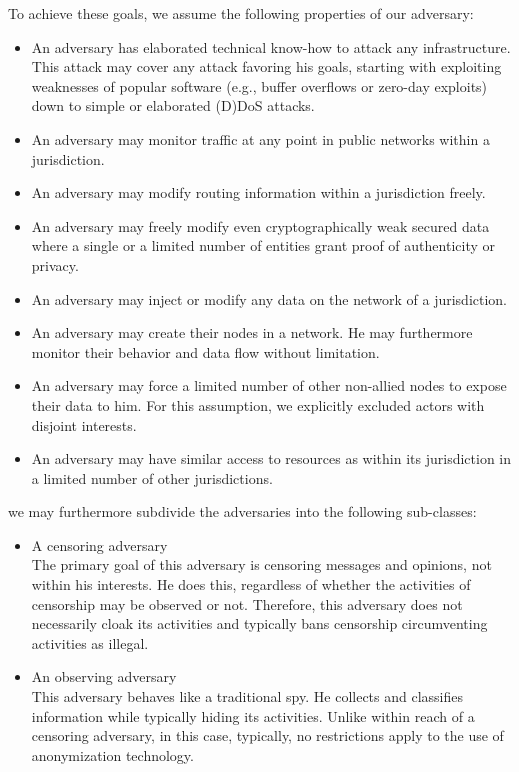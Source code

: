 To achieve these goals, we assume the following properties of our adversary:
\begin{itemize}
	\item An adversary has elaborated technical know-how to attack any infrastructure. This attack may cover any attack favoring his goals, starting with exploiting weaknesses of popular software (e.g., buffer overflows or zero-day exploits) down to simple or elaborated (D)DoS attacks.
	\item An adversary may monitor traffic at any point in public networks within a jurisdiction.
	\item An adversary may modify routing information within a jurisdiction freely.
	\item An adversary may freely modify even cryptographically weak secured data where a single or a limited number of entities grant proof of authenticity or privacy.
	\item An adversary may inject or modify any data on the network of a jurisdiction.
	\item An adversary may create their nodes in a network. He may furthermore monitor their behavior and data flow without limitation.
	\item An adversary may force a limited number of other non-allied nodes to expose their data to him. For this assumption, we explicitly excluded actors with disjoint interests.
	\item An adversary may have similar access to resources as within its jurisdiction in a limited number of other jurisdictions.
\end{itemize}

we may furthermore subdivide the adversaries into the following sub-classes:
\begin{itemize}
	\item A censoring adversary\\
	The primary goal of this adversary is censoring messages and opinions, not within his interests. He does this, regardless of whether the activities of censorship may be observed or not. Therefore, this adversary does not necessarily cloak its activities and typically bans censorship circumventing activities as illegal.
	\item An observing adversary\\
	This adversary behaves like a traditional spy. He collects and classifies information while typically hiding its activities. Unlike within reach of a censoring adversary, in this case, typically, no restrictions apply to the use of anonymization technology.
\end{itemize}

